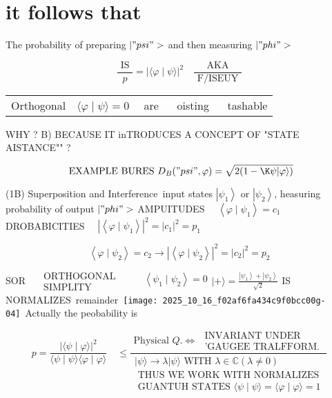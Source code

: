 \section*{it follows that}
The probability of preparing $|"psi">$ and then measuring $|"phi">$

$$ \frac{\text { IS }}{p}=|\langle\varphi \mid \psi\rangle|^{2} \quad \frac{\text { AKA }}{\text { F/ISEUY }}
$$ 

\begin{center}
\begin{tabular}{ll}
Orthogonal & $\langle\varphi \mid \psi\rangle=0 \quad$ are $\quad$ oisting $\quad$ tashable \\
\end{tabular}
\end{center}

WHY ? B) BECAUSE IT inTRODUCES A CONCEPT OF "STATE AISTANCE"\METRIC" ?

$$ \text { EXAMPLE BURES } D_{B}("psi", \varphi)=\sqrt{2(1-\K \psi|\varphi\rangle)}
$$ 

(1B) Superposition and Interference\
input states $\left|\psi_{1}\right\rangle$ or $\left|\psi_{2}\right\rangle$, heasuring probability of output $|"phi">$
AMPUITUDES $\quad\left\langle\varphi \mid \psi_{1}\right\rangle=c_{1} \quad$ DROBABICITIES $\quad\left|\left\langle\varphi \mid \psi_{1}\right\rangle\right|^{2}=\left|c_{1}\right|^{2}=p_{1}$

$$ \left\langle\varphi \mid \psi_{2}\right\rangle=c_{2} \longrightarrow\left|\left\langle\varphi \mid \psi_{2}\right\rangle\right|^{2}=\left|c_{2}\right|^{2}=p_{2} $$

SOR $\begin{aligned} & \text { ORTHOGONAL } \\ & \text { SIMPLITY }\end{aligned} \quad \begin{aligned} & \left\langle\psi_{1} \mid \psi_{2}\right\rangle=0 \\ & \end{aligned}|+\rangle=\frac{\left|\psi_{1}\right\rangle+\left|\psi_{2}\right\rangle}{\sqrt{2}}$ IS NORMALIZES\
remainder\
\texttt{[image: 2025\_10\_16\_f02af6fa434c9f0bcc00g-04]}\
Actually the peobability is

$$ p=\frac{|\langle\psi \mid \varphi\rangle|^{2}}{\langle\psi \mid \psi\rangle\langle\varphi \mid \varphi\rangle} \quad \leqslant \frac{\text { Physical } Q . \Leftrightarrow \begin{array}{l}\text { INVARIANT UNDER } \\ \text { 'GAUGEE TRALFFORM. }\end{array}}{\begin{array}{r}|\psi\rangle \rightarrow \lambda|\psi\rangle \text { WITH } \lambda \in \mathbb{C}(\lambda \neq 0) \\ \text { THUS WE WORK WITH NORMALIZES } \\ \text { GUANTUH STATES }\langle\psi \mid \psi\rangle=\langle\varphi \mid \varphi\rangle=1\end{array}} $$

